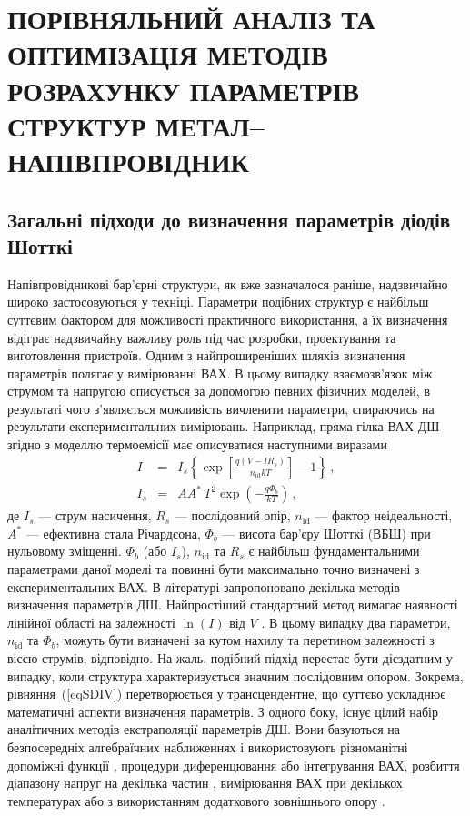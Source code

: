 \chapter{\MakeUppercase{Порівняльний аналіз та оптимізація методів розрахунку параметрів структур метал--напівпровідник}\label{Ch_MSMethod}}


\section{Загальні підходи до визначення параметрів діодів Шотткі}
Напівпровідникові бар'єрні структури, як вже зазначалося раніше, надзвичайно широко застосовуються у техніці.
Параметри подібних структур є найбільш суттєвим фактором для можливості практичного використання,
а їх визначення відіграє надзвичайну важливу роль під час розробки, проектування та виготовлення пристроїв.
Одним з найпроширеніших шляхів визначення параметрів полягає у вимірюванні ВАХ.
В цьому випадку взаємозв'язок між струмом та напругою описується за допомогою певних фізичних моделей, в
результаті чого з'являється можливість вичленити параметри, спираючись на результати експериментальних вимірювань.
Наприклад, пряма гілка ВАХ ДШ згідно з моделлю термоемісії має описуватися \cite{Rhoderick1988} наступними виразами
\begin{eqnarray}
\label{eqSDIV}
I&=&I_s\left\{\exp\left[\frac{q(V-IR_s)}{n_\mathrm{id}kT}\right]-1\right\}\,,\\
\label{eqSDIs}
I_s&=&AA^*\,T^2\exp\left(-\frac{q\Phi_b}{kT}\right)\,,
\end{eqnarray}
де
$I_s$ --- струм насичення,
$R_s$ --- послідовний опір,
$n_\mathrm{id}$ --- фактор неідеальності,
$A^*$ --- ефективна стала Річардсона,
$\Phi_b$ --- висота бар'єру Шотткі (ВБШ) при нульовому зміщенні.
$\Phi_b$ (або $I_s$), $n_\mathrm{id}$ та $R_s$ є найбільш фундаментальними параметрами даної моделі та повинні бути максимально точно визначені з експериментальних ВАХ.
В літературі запропоновано декілька методів визначення параметрів ДШ.
Найпростіший стандартний метод вимагає наявності лінійної області на залежності $\ln(I)$ від  $V$ \cite{Sze2012,Rhoderick1988}.
В цьому випадку два параметри, $n_\mathrm{id}$ та $\Phi_b$, можуть бути визначені за кутом нахилу та перетином  залежності з віссю струмів, відповідно.
На жаль, подібний підхід перестає бути дієздатним у випадку, коли структура характеризується значним послідовним опором.
Зокрема, рівняння~(\ref{eqSDIV}) перетворюється у трансцендентне, що суттєво ускладнює математичні аспекти визначення параметрів.
З одного боку, існує цілий набір аналітичних методів екстраполяції параметрів ДШ.
Вони базуються на безпосередніх алгебраїчних наближеннях і використовують різноманітні допоміжні функції \cite{Norde,Lien,Werner,Cheung,Gromov,Lee,Bohlin,Cibils,Manifacier},
процедури  диференцювання  \cite{Mikhelashvili} або інтегрування  \cite{Kaminski,Ortiz1995,Durmus} ВАХ,
розбиття діапазону напруг на декілька частин \cite{Cataldo},
вимірювання ВАХ при декількох температурах \cite{Sato} або з використанням додаткового зовнішнього опору \cite{Lyakas}.


